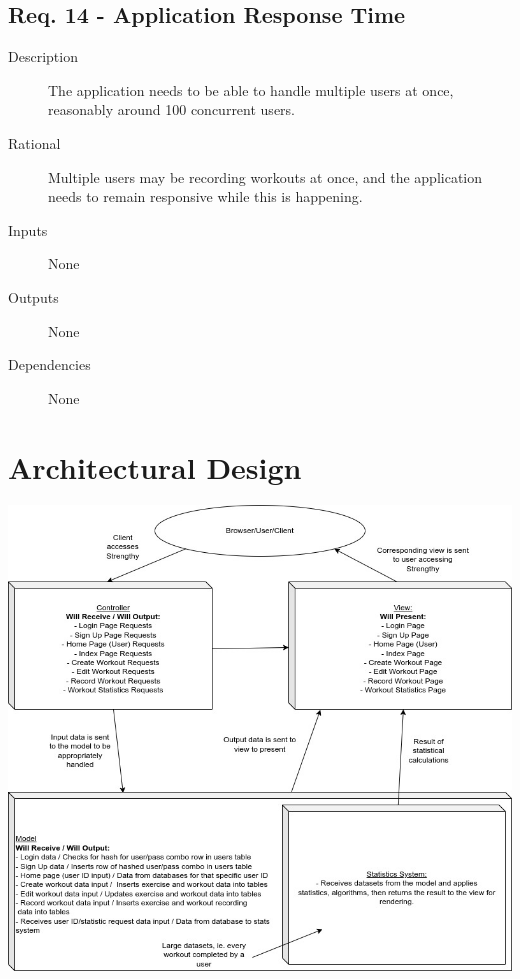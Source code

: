 \documentclass[12pt]{article}
\begin{document}
\subsection{Req. 14 - Application Response Time}
\begin{description}
	\item[Description] The application needs to be able to handle multiple users at once, reasonably around 100 concurrent users.
	\item[Rational] Multiple users may be recording workouts at once, and the application needs to remain responsive while this is happening.
	\item[Inputs] None
	\item[Outputs] None
	\item[Dependencies] None
\end{description}

\section{Architectural Design}
\includegraphics[width=1.0\textwidth]{strengthy_architecture.jpg}
\begingroup
\renewcommand{\section}[2]{}
\begin{thebibliography}{10}
\bigskip
\end{thebibliography}
\endgroup
\end{document}
